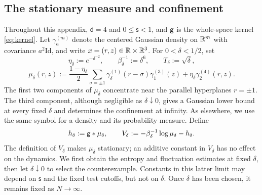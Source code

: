 \documentclass[11pt,reqno]{amsart}
\numberwithin{equation}{section}
\theoremstyle{plain}
\theoremstyle{remark}
\renewcommand{\d}{\mathsf{d}}\newcommand{\s}{\mathsf{s}}
\newcommand{\Id}{\mathrm{Id}}
\begin{document}
\subsection{The stationary measure and confinement}\label{iid:subsec:construction}
Throughout this appendix, $\d=4$ and $0\le\s<1$, and $\mathsf g$ is the whole-space kernel \eqref{eq:kernel}.
Let $\gamma_a^{(m)}$ denote the centered Gaussian density on $\mathbb R^m$ with covariance $a^2\Id$, and write $x=(r,z)\in\mathbb R\times\mathbb R^3$. For $0<\delta<1/2$, set
\begin{equation}\label{iid:eq:parameters}
 \eta_\delta:=e^{-\delta^{-2}},\qquad \beta_\delta^{-1}:=\delta^6,\qquad T_\delta:=\sqrt\delta,
\end{equation}
\begin{equation}\label{iid:eq:mu}
 \mu_\delta(r,z):=\frac{1-\eta_\delta}{2}\sum_{\sigma=\pm1}
 \gamma_\delta^{(1)}(r-\sigma)\gamma_1^{(3)}(z)
 +\eta_\delta\gamma_2^{(4)}(r,z).
\end{equation}
The first two components of $\mu_\delta$ concentrate near the parallel hyperplanes $r=\pm1$. The third component, although negligible as $\delta\downarrow0$, gives a Gaussian lower bound at every fixed $\delta$ and determines the confinement at infinity. As elsewhere, we use the same symbol for a density and its probability measure. Define
\begin{equation}\label{iid:eq:V}
 h_\delta:=\mathsf g*\mu_\delta,\qquad
 V_\delta:=-\beta_\delta^{-1}\log\mu_\delta-h_\delta.
\end{equation}
The definition of $V_\delta$ makes $\mu_\delta$ stationary; an additive constant in $V_\delta$ has no effect on the dynamics. We first obtain the entropy and fluctuation estimates at fixed $\delta$, then let $\delta\downarrow0$ to select the counterexample. Constants in this latter limit may depend on $\s$ and the fixed test cutoffs, but not on $\delta$. Once $\delta$ has been chosen, it remains fixed as $N\to\infty$.
\end{document}
